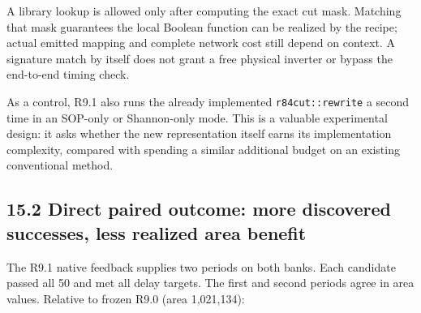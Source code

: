 \documentclass[a4paper,10pt]{article}
\theoremstyle{definition}
\theoremstyle{remark}
\begin{document}
A library lookup is allowed only after computing the exact cut mask. Matching that mask guarantees the local Boolean function can be realized by the recipe; actual emitted mapping and complete network cost still depend on context. A signature match by itself does not grant a free physical inverter or bypass the end-to-end timing check.

As a control, R9.1 also runs the already implemented \texttt{r84cut::rewrite} a second time in an SOP-only or Shannon-only mode. This is a valuable experimental design: it asks whether the new representation itself earns its implementation complexity, compared with spending a similar additional budget on an existing conventional method.

\subsection{15.2 Direct paired outcome: more discovered successes, less realized area benefit}\label{direct-paired-outcome-more-discovered-successes-less-realized-area-benefit}

The R9.1 native feedback supplies two periods on both banks. Each candidate passed all 50 and met all delay targets. The first and second periods agree in area values. Relative to frozen R9.0 (area 1,021,134):
\end{document}
